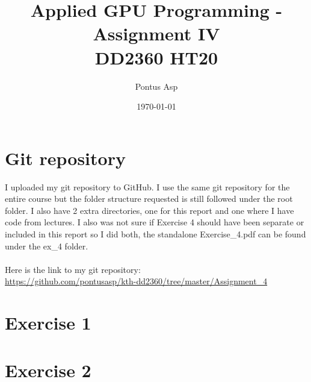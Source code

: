 \documentclass[a4paper, 12pt]{article}
\begin{document}
\title{\vspace{4.0cm}Applied GPU Programming - Assignment IV\\
\large DD2360 HT20}
\author{Pontus Asp}
\date{\today}
\maketitle
\thispagestyle{empty}
\newpage

\clearpage
{}

\section{Git repository}
I uploaded my git repository to GitHub. I use the same git repository for the entire course but the folder structure requested is still followed under the root folder. I also have 2 extra directories, one for this report and one where I have code from lectures. I also was not sure if Exercise 4 should have been separate or included in this report so I did both, the standalone Exercise\_4.pdf can be found under the ex\_4 folder.
\\\\
Here is the link to my git repository:\\
\url{https://github.com/pontusasp/kth-dd2360/tree/master/Assignment_4}

\section{Exercise 1}

\section{Exercise 2}
\end{document}
